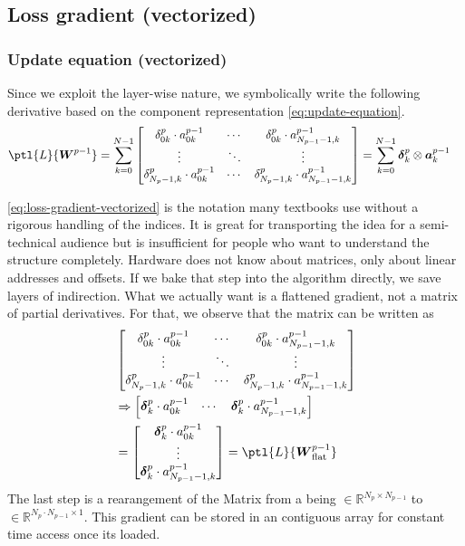 \subsection{Loss gradient (vectorized)}
\subsubsection{Update equation (vectorized)}
Since we exploit the layer-wise nature, we symbolically write the following derivative based on the component representation \eqref{eq:update-equation}.
\begin{align}
	\label{eq:loss-gradient-vectorized}
	\ptl{L}{\boldsymbol{W}^{p-1}}&=\sum\limits_{k=0}^{N-1}\begin{bmatrix}
		\delta_{0k}^p\cdot a_{0k}^{p-1}&\cdots&\delta_{0k}^p\cdot a_{N_{p-1}-1,k}^{p-1}\\
		\vdots&\ddots&\vdots\\
		\delta_{N_{p}-1,k}^p\cdot a_{0k}^{p-1}&\cdots&\delta_{N_{p}-1,k}^p\cdot a_{N_{p-1}-1,k}^{p-1}\\
	\end{bmatrix}=\sum\limits_{k=0}^{N-1}\boldsymbol{\delta}^p_k\otimes\boldsymbol{a}^{p-1}_k
\end{align}

\eqref{eq:loss-gradient-vectorized} is the notation many textbooks use without a rigorous handling of the indices. It is great for transporting the idea for a semi-technical audience but is insufficient for people who want to understand the structure completely. Hardware does not know about matrices, only about linear addresses and offsets. If we bake that step into the algorithm directly, we save layers of indirection. What we actually want is a flattened gradient, not a matrix of partial derivatives. For that, we observe that the matrix can be written as
\begin{align}
	&\begin{bmatrix}
		\delta_{0k}^p\cdot a_{0k}^{p-1}&\cdots&\delta_{0k}^p\cdot a_{N_{p-1}-1,k}^{p-1}\\
		\vdots&\ddots&\vdots\\
		\delta_{N_{p}-1,k}^p\cdot a_{0k}^{p-1}&\cdots&\delta_{N_{p}-1,k}^p\cdot a_{N_{p-1}-1,k}^{p-1}
	\end{bmatrix}\\
	&\Rightarrow\begin{bmatrix}\boldsymbol{\delta}^p_k\cdot a_{0k}^{p-1} & \cdots &\boldsymbol{\delta}^p_k\cdot a_{N_{p-1}-1,k}^{p-1} \end{bmatrix}\\&=\begin{bmatrix}\boldsymbol{\delta}^p_k\cdot a_{0k}^{p-1} \\ \vdots \\ \boldsymbol{\delta}^p_k\cdot a_{N_{p-1}-1,k}^{p-1} \end{bmatrix}=	\ptl{L}{\boldsymbol{W}^{p-1}_\mathrm{flat}}
\end{align}
The last step is a rearangement of the Matrix from a being $\in \mathbb{R}^{N_p\times N_{p-1}}$ to $\in \mathbb{R}^{N_p\cdot N_{p-1}\times 1}$. This gradient can be stored in an contiguous array for constant time access once its loaded.
